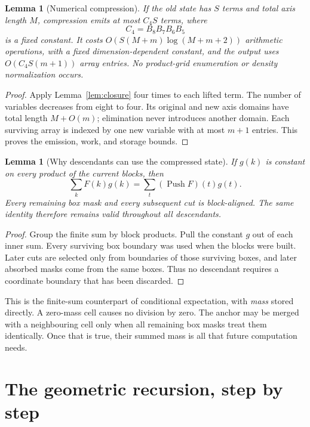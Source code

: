 \documentclass[12pt,a4paper]{article}
\newtheorem{lemma}[theorem]{Lemma}
\theoremstyle{remark}
\newcommand{\1}{\mathbf1}
\newcommand{\Push}{\operatorname{Push}}
\begin{document}
\begin{lemma}[Numerical compression]\label{lem:push}
If the old state has $S$ terms and total axis length $M$, compression emits
at most $C_4S$ terms, where
\[
                    C_4=B_8B_7B_6B_5
\]
is a fixed constant. It costs $O(S(M+m)\log(M+m+2))$ arithmetic operations,
with a fixed dimension-dependent constant, and the output uses $O(C_4S(m+1))$
array entries. No product-grid enumeration or density normalization occurs.
\end{lemma}
\begin{proof}
Apply Lemma~\ref{lem:closure} four times to each lifted term. The number
of variables decreases from eight to four. Its original and new axis
domains have total length $M+O(m)$; elimination never introduces another
domain. Each surviving array is indexed by one new variable with at most
$m+1$ entries. This proves the emission, work, and storage bounds.
\end{proof}

\begin{lemma}[Why descendants can use the compressed state]\label{lem:future}
If $g(k)$ is constant on every product of the current blocks, then
\[
                 \sum_k F(k)g(k)=\sum_t(\Push F)(t)g(t).
\]
Every remaining box mask and every subsequent cut is block-aligned.
The same identity therefore remains valid throughout all descendants.
\end{lemma}
\begin{proof}
Group the finite sum by block products. Pull the constant $g$ out of
each inner sum. Every surviving box boundary was used when the blocks
were built. Later cuts are selected only from boundaries of those surviving
boxes, and later absorbed masks come from the same boxes. Thus no
descendant requires a coordinate boundary that has been discarded.
\end{proof}

This is the finite-sum counterpart of conditional expectation, with
\emph{mass} stored directly. A zero-mass cell causes no division by zero.
The anchor may be merged with a neighbouring cell only when all remaining
box masks treat them identically. Once that is true, their summed mass is
all that future computation needs.

\section{The geometric recursion, step by step}\label{sec:recursion}
\end{document}
